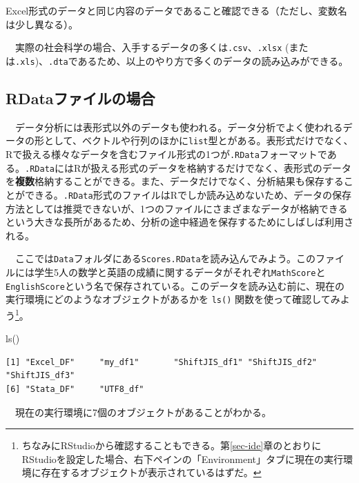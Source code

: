\documentclass[
  a4paper,
  pandoc,
  ja=standard,
  jafont=haranoaji]{bxjsbook}
\newenvironment{Shaded}{\begin{snugshade}}{\end{snugshade}}
\newcommand{\FunctionTok}[1]{\textcolor[rgb]{0.28,0.35,0.67}{#1}}
\newcommand{\NormalTok}[1]{\textcolor[rgb]{0.00,0.48,0.65}{#1}}
\begin{document}
Excel形式のデータと同じ内容のデータであること確認できる（ただし、変数名は少し異なる）。

　実際の社会科学の場合、入手するデータの多くは\texttt{.csv}、\texttt{.xlsx}
(または\texttt{.xls})、\texttt{.dta}であるため、以上のやり方で多くのデータの読み込みができる。

\hypertarget{rdataux30d5ux30a1ux30a4ux30ebux306eux5834ux5408}{%
\subsection{RDataファイルの場合}\label{rdataux30d5ux30a1ux30a4ux30ebux306eux5834ux5408}}

　データ分析には表形式以外のデータも使われる。データ分析でよく使われるデータの形として、ベクトルや行列のほかに\texttt{list}型とがある。表形式だけでなく、Rで扱える様々なデータを含むファイル形式の1つが\texttt{.RData}フォーマットである。\texttt{.RData}にはRが扱える形式のデータを格納するだけでなく、表形式のデータを\textbf{複数}格納することができる。また、データだけでなく、分析結果も保存することができる。\texttt{.RData}形式のファイルはRでしか読み込めないため、データの保存方法としては推奨できないが、1つのファイルにさまざまなデータが格納できるという大きな長所があるため、分析の途中経過を保存するためにしばしば利用される。

　ここでは\texttt{Data}フォルダにある\texttt{Scores.RData}を読み込んでみよう。このファイルには学生5人の数学と英語の成績に関するデータがそれぞれ\texttt{MathScore}と\texttt{EnglishScore}という名で保存されている。このデータを読み込む前に、現在の実行環境にどのようなオブジェクトがあるかを
\texttt{ls()} 関数を使って確認してみよう\footnote{ちなみにRStudioから確認することもできる。第\ref{sec-ide}章のとおりにRStudioを設定した場合、右下ペインの「Environment」タブに現在の実行環境に存在するオブジェクトが表示されているはずだ。}。

\begin{Shaded}
\begin{Highlighting}[numbers=left,,]
\FunctionTok{ls}\NormalTok{()}
\end{Highlighting}
\end{Shaded}

\begin{verbatim}
[1] "Excel_DF"     "my_df1"       "ShiftJIS_df1" "ShiftJIS_df2" "ShiftJIS_df3"
[6] "Stata_DF"     "UTF8_df"     
\end{verbatim}

　現在の実行環境に7個のオブジェクトがあることがわかる。
\end{document}
